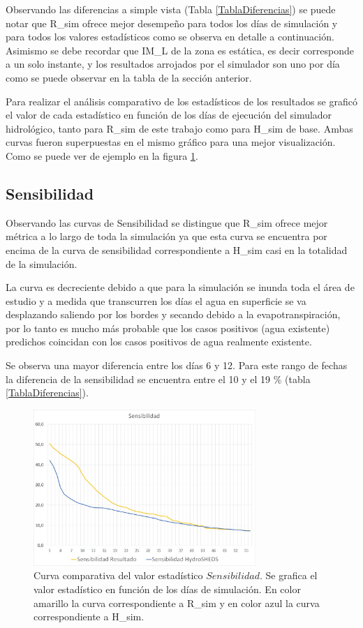 \documentclass[10pt,a4paper, twoside]{report}
\begin{document}
Observando las diferencias a simple vista (Tabla \ref{TablaDiferencias}) se puede notar que R\_sim ofrece mejor desempeño para todos los días de simulación y para todos los valores estadísticos como se observa en detalle a continuación. Asimismo se debe recordar que IM\_L de la zona es estática, es decir corresponde a un solo instante, y los resultados arrojados por el simulador son uno por día como se puede observar en la tabla de la sección anterior.


Para realizar el análisis comparativo de los estadísticos de los resultados se graficó el valor de cada estadístico en función de los días de ejecución del simulador hidrológico, tanto para R\_sim de este trabajo como para H\_sim de base. Ambas curvas fueron superpuestas en el mismo gráfico para una mejor visualización. Como se puede ver de ejemplo en la figura \ref{Sensibilidad}.

\subsection{Sensibilidad}

Observando las curvas de Sensibilidad se distingue que R\_sim ofrece mejor métrica a lo largo de toda la simulación ya que esta curva se encuentra por encima de la curva de sensibilidad correspondiente a H\_sim casi en la totalidad de la simulación.

La curva es decreciente debido a que para la simulación se inunda toda el área de estudio y a medida que transcurren los días el agua en superficie se va desplazando saliendo por los bordes y secando debido a la evapotranspiración, por lo tanto es mucho más probable que los casos positivos (agua existente) predichos coincidan con los casos positivos de agua realmente existente.

Se observa una mayor diferencia entre los días 6 y 12. Para este rango de fechas la diferencia de la sensibilidad se encuentra entre el 10 y el 19 \% (tabla \ref{TablaDiferencias}).


\begin{figure}[H]
   \centering      
   \includegraphics[width=0.75\textwidth]{imagenes/Sensibilidad.jpg}
 \caption{Curva comparativa del valor estadístico $Sensibilidad$. Se grafica el valor estadístico en función de los días de simulación. En color amarillo la curva correspondiente a R\_sim y en color azul la curva correspondiente a H\_sim.}
 \label{Sensibilidad}
\end{figure}
\end{document}
